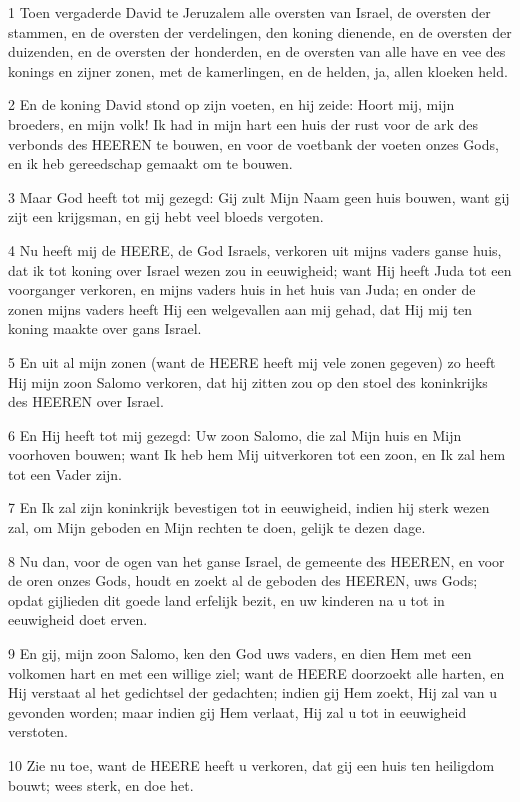 \par 1 Toen vergaderde David te Jeruzalem alle oversten van Israel, de oversten der stammen, en de oversten der verdelingen, den koning dienende, en de oversten der duizenden, en de oversten der honderden, en de oversten van alle have en vee des konings en zijner zonen, met de kamerlingen, en de helden, ja, allen kloeken held.
\par 2 En de koning David stond op zijn voeten, en hij zeide: Hoort mij, mijn broeders, en mijn volk! Ik had in mijn hart een huis der rust voor de ark des verbonds des HEEREN te bouwen, en voor de voetbank der voeten onzes Gods, en ik heb gereedschap gemaakt om te bouwen.
\par 3 Maar God heeft tot mij gezegd: Gij zult Mijn Naam geen huis bouwen, want gij zijt een krijgsman, en gij hebt veel bloeds vergoten.
\par 4 Nu heeft mij de HEERE, de God Israels, verkoren uit mijns vaders ganse huis, dat ik tot koning over Israel wezen zou in eeuwigheid; want Hij heeft Juda tot een voorganger verkoren, en mijns vaders huis in het huis van Juda; en onder de zonen mijns vaders heeft Hij een welgevallen aan mij gehad, dat Hij mij ten koning maakte over gans Israel.
\par 5 En uit al mijn zonen (want de HEERE heeft mij vele zonen gegeven) zo heeft Hij mijn zoon Salomo verkoren, dat hij zitten zou op den stoel des koninkrijks des HEEREN over Israel.
\par 6 En Hij heeft tot mij gezegd: Uw zoon Salomo, die zal Mijn huis en Mijn voorhoven bouwen; want Ik heb hem Mij uitverkoren tot een zoon, en Ik zal hem tot een Vader zijn.
\par 7 En Ik zal zijn koninkrijk bevestigen tot in eeuwigheid, indien hij sterk wezen zal, om Mijn geboden en Mijn rechten te doen, gelijk te dezen dage.
\par 8 Nu dan, voor de ogen van het ganse Israel, de gemeente des HEEREN, en voor de oren onzes Gods, houdt en zoekt al de geboden des HEEREN, uws Gods; opdat gijlieden dit goede land erfelijk bezit, en uw kinderen na u tot in eeuwigheid doet erven.
\par 9 En gij, mijn zoon Salomo, ken den God uws vaders, en dien Hem met een volkomen hart en met een willige ziel; want de HEERE doorzoekt alle harten, en Hij verstaat al het gedichtsel der gedachten; indien gij Hem zoekt, Hij zal van u gevonden worden; maar indien gij Hem verlaat, Hij zal u tot in eeuwigheid verstoten.
\par 10 Zie nu toe, want de HEERE heeft u verkoren, dat gij een huis ten heiligdom bouwt; wees sterk, en doe het.
